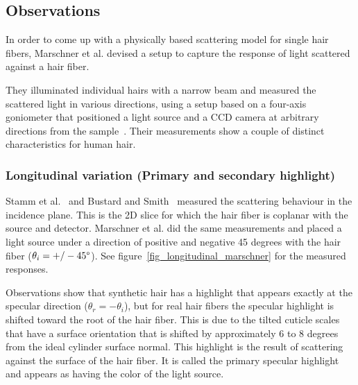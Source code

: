 \documentclass[11pt,a4paper]{report}
\begin{document}
\subsection{Observations}
%
%
 
In order to come up with a physically based scattering model for single hair fibers, Marschner et al. devised a setup to capture the response of light scattered against a hair fiber. 

They illuminated individual hairs with a narrow beam and measured the scattered light in various directions, using a setup based on a four-axis goniometer that positioned a light source and a CCD camera at arbitrary directions from the sample~\cite{marschner}. Their measurements show a couple of distinct characteristics for human hair.

\subsubsection{Longitudinal variation (Primary and secondary highlight)}
\label{sec_longitudinal_observation}

Stamm et al.~\cite{stamm1977} and Bustard and Smith~\cite{bustard1991} measured the scattering behaviour in the incidence plane. This is the 2D slice for which the hair fiber is coplanar with the source and detector. Marschner et al. did the same measurements and placed a light source under a direction of positive and negative 45 degrees with the hair fiber ($\theta_i = +/- 45\degree$). See figure~\ref{fig_longitudinal_marschner} for the measured responses.

Observations show that synthetic hair has a highlight that appears exactly at the specular direction ($\theta_r = -\theta_i$), but for real hair fibers the specular highlight is shifted toward the root of the hair fiber. This is due to the tilted cuticle scales that have a surface orientation that is shifted by approximately 6 to 8 degrees from the ideal cylinder surface normal. This highlight is the result of scattering against the surface of the hair fiber. It is called the primary specular highlight and appears as having the color of the light source.
\end{document}
